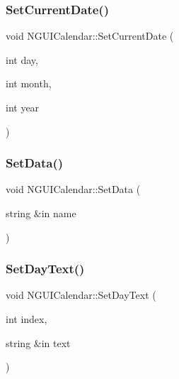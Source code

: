 \hypertarget{class_n_g_u_i_calendar_a5e297c7dc94c87539ba2bd477dc77ed8}{}\label{class_n_g_u_i_calendar_a5e297c7dc94c87539ba2bd477dc77ed8} 
\subsubsection{\texorpdfstring{Set\+Current\+Date()}{SetCurrentDate()}}
{\footnotesize\ttfamily void N\+G\+U\+I\+Calendar\+::\+Set\+Current\+Date (\begin{DoxyParamCaption}\item[{int}]{day,  }\item[{int}]{month,  }\item[{int}]{year }\end{DoxyParamCaption})}

\hypertarget{class_n_g_u_i_calendar_a5eebfc3d7dea7ec38292530cfc3d698a}{}\label{class_n_g_u_i_calendar_a5eebfc3d7dea7ec38292530cfc3d698a} 
\subsubsection{\texorpdfstring{Set\+Data()}{SetData()}}
{\footnotesize\ttfamily void N\+G\+U\+I\+Calendar\+::\+Set\+Data (\begin{DoxyParamCaption}\item[{string \&in}]{name }\end{DoxyParamCaption})}

\hypertarget{class_n_g_u_i_calendar_a65aa9a3b2e9ee559f92b206322d7c8d8}{}\label{class_n_g_u_i_calendar_a65aa9a3b2e9ee559f92b206322d7c8d8} 
\subsubsection{\texorpdfstring{Set\+Day\+Text()}{SetDayText()}}
{\footnotesize\ttfamily void N\+G\+U\+I\+Calendar\+::\+Set\+Day\+Text (\begin{DoxyParamCaption}\item[{int}]{index,  }\item[{string \&in}]{text }\end{DoxyParamCaption})}

